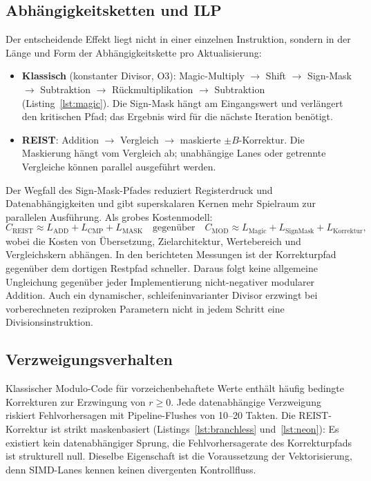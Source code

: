 \documentclass[11pt,a4paper]{scrartcl}
\theoremstyle{definition}
\theoremstyle{plain}
\theoremstyle{remark}
\begin{document}
\subsection{Abhängigkeitsketten und ILP}

Der entscheidende Effekt liegt nicht in einer einzelnen Instruktion, sondern in der Länge und Form der Abhängigkeitskette pro Aktualisierung:

\begin{itemize}
\item \textbf{Klassisch} (konstanter Divisor, O3): Magic-Multiply $\to$ Shift $\to$ Sign-Mask $\to$ Subtraktion $\to$ Rückmultiplikation $\to$ Subtraktion (Listing~\ref{lst:magic}). Die Sign-Mask hängt am Eingangswert und verlängert den kritischen Pfad; das Ergebnis wird für die nächste Iteration benötigt.
\item \textbf{REIST}: Addition $\to$ Vergleich $\to$ maskierte $\pm B$-Korrektur. Die Maskierung hängt vom Vergleich ab; unabhängige Lanes oder getrennte Vergleiche können parallel ausgeführt werden.
\end{itemize}

Der Wegfall des Sign-Mask-Pfades reduziert Registerdruck und Datenabhängigkeiten und gibt superskalaren Kernen mehr Spielraum zur parallelen Ausführung. Als grobes Kostenmodell:
\begin{equation}
C_{\mathrm{REIST}} \approx L_{\mathrm{ADD}} + L_{\mathrm{CMP}} + L_{\mathrm{MASK}}
\quad\text{gegenüber}\quad
C_{\mathrm{MOD}} \approx L_{\mathrm{Magic}} + L_{\mathrm{SignMask}} + L_{\mathrm{Korrektur}},
\end{equation}
wobei die Kosten von Übersetzung, Zielarchitektur, Wertebereich und Vergleichskern abhängen. In den berichteten Messungen ist der Korrekturpfad gegenüber dem dortigen Restpfad schneller. Daraus folgt keine allgemeine Ungleichung gegenüber jeder Implementierung nicht-negativer modularer Addition. Auch ein dynamischer, schleifeninvarianter Divisor erzwingt bei vorberechneten reziproken Parametern nicht in jedem Schritt eine Divisionsinstruktion.

\subsection{Verzweigungsverhalten}

Klassischer Modulo-Code für vorzeichenbehaftete Werte enthält häufig bedingte Korrekturen zur Erzwingung von $r \ge 0$. Jede datenabhängige Verzweigung riskiert Fehlvorhersagen mit Pipeline-Flushes von 10--20 Takten. Die REIST-Korrektur ist strikt maskenbasiert (Listings~\ref{lst:branchless} und~\ref{lst:neon}): Es existiert kein datenabhängiger Sprung, die Fehlvorhersagerate des Korrekturpfads ist strukturell null. Dieselbe Eigenschaft ist die Voraussetzung der Vektorisierung, denn SIMD-Lanes kennen keinen divergenten Kontrollfluss.
\end{document}
